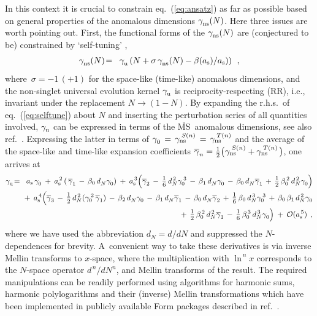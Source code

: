 \documentclass[12pt]{article}
\newcommand{\bea}{\begin{eqnarray}}
\newcommand{\eea}{\end{eqnarray}}
\newcommand{\nn}{\nonumber}
\newcommand{\MSb}{$\overline{\mbox{MS}}$}
\newcommand{\ars}{a_{\rm s}}
\newcommand{\hspn}{{\hspace{-5mm}}}
\newcommand{\hspp}{{\hspace{5mm}}}
\def\frct#1#2{\mbox{\large{$\frac{#1}{#2}$}}}
\def\ar(#1){{a_{\rm s}^{\,#1}}}
\def\b#1{{\beta_{#1}}}
\def\B(#1,#2){{\beta_{#1}^{\,#2}}}
\begin{document}
In this context it is crucial to constrain eq.~(\ref{eq:ansatz}) as far as 
possible based on general properties of the anomalous dimensions 
$\gamma_{\rm ns}^{}(N)$. Here three issues are worth pointing out.
%
First, the functional forms of the $\gamma_{\rm ns}^{}(N)$ are (conjectured 
to be) constrained by `self-tuning' \cite{Dokshitzer:2006nm,Basso:2006nk},
%
\bea
\label{eq:selftune}
  \gamma_{\rm ns}^{}(N) &\!=\!& \gamma_{\rm u}^{} 
  \left( N + \sigma \,\gamma_{\rm ns}^{}(N)-\beta(\ars)/\ars ) \right)
\:\: ,
\eea
where $\,\sigma = -1\, (+1)$ for the space-like (time-like) anomalous 
dimensions, and the non-singlet universal evolution kernel $\gamma_{\rm u}^{}$ 
is reciprocity-respecting (RR), i.e., invariant under the replacement 
$N \to (1-N)$.
%
By expanding the r.h.s.~of eq.~(\ref{eq:selftune}) about $N$ and inserting
the perturbation series of all quantities involved, $\gamma_{{\rm u}}^{}$ 
can be expressed in terms of the \MSb\ anomalous dimensions, see also 
ref.~\cite{Braun:2017cih}.
Expressing the latter in terms of 
$\gamma_0^{} \,=\, \gamma_{\rm ns}^{\:S(n)} \,=\, \gamma_{\rm ns}^{\:T(n)}$ 
and the average of the space-like and time-like expansion coefficients 
$\overline{\gamma}_n^{}= \frac{1}{2} \big( \:\!\gamma_{\rm ns}^{\:S(n)} 
+ \gamma_{\rm ns}^{\:T(n)\,} \big)$, one arrives at
%
\bea
  \gamma_{\rm u}^{} &\!=\!&
         \ars \,\* \gamma_0^{} 
   \:+\: \ar(2) \* \left( \,
         \overline{\gamma}_1^{} 
      \,-\, \b0 \,\* d_N^{} \* \gamma_0^{} 
       \right)
   \:+\: \ar(3) \* \Big( 
         \overline{\gamma}_2^{} 
      \,-\, \frct{1}{6}\, \* d_N^{\,2\,} \* \gamma_0^{\:3}
      \,-\, \b1 \,\* d_N^{} \* \gamma_0^{} 
      \,-\, \b0 \,\* d_N^{} \* \overline{\gamma}_1^{} 
      \,+\, \frct{1}{2}\, \* \B(0,2) \,\* d_N^{\,2\,} \* \gamma_0^{}  
      \Big)
\nn \\ & & \mbox{\hspn} 
   \:+\: \ar(4) \* \Big(
         \overline{\gamma}_3^{} 
      \,-\, \frct{1}{2}\, \* d_N^{\,2\,} \* 
         ( \gamma_0^{\:2}\,\overline{\gamma}_1^{} ) 
      \,-\, \b2\,\* d_N^{} \* \gamma_0^{} 
      \,-\, \b1\,\* d_N^{} \* \overline{\gamma}_1^{} 
      \,-\, \b0\,\* d_N^{} \* \overline{\gamma}_2^{} 
      \,+\, \frct{1}{6}\, \* \b0 \,\* d_N^{\,3\,} \* \gamma_0^{\:3}
      \,+\, \b0\,\* \b1\,\* d_N^{\,2\,} \* \gamma_0^{}
\nn \\ & & \mbox{\hspp} 
      \,+\, \frct{1}{2}\, \* \B(0,2) \,\* d_N^{\,2\:} \* \overline{\gamma}_1^{}
      \,-\, \frct{1}{6}\, \* \B(0,3) \,\* d_N^{\,3\:} \* \gamma_0^{}
      \Big)
  \:+\: {\cal O}(\ar(5))
\:\: ,
\eea
%
where we have used the abbreviation $d_N^{} = d/dN$ and suppressed the
$N$-dependences for brevity. 
A~convenient way to take these derivatives is via inverse Mellin transforms 
to $x$-space, where the multiplication with $\ln^{\,n\!}x$ corresponds to 
the $N$-space operator $d^{\,n\!}/dN^{n}$, and Mellin transforms of the
result. 
The required manipulations can be readily performed using algorithms for
harmonic sums, harmonic polylogarithms and their (inverse) Mellin 
transformations \cite{Vermaseren:1998uu,Remiddi:1999ew,Moch:1999eb} 
which have been implemented in publicly available {\sc Form} packages 
described in ref.~\cite{Vermaseren:2000nd}.
\end{document}
